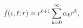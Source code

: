 \[\mathop{f\/}\nolimits\!\left(\epsilon,\ell;r\right)=r^{\ell+1}\sum_{k=0}^{%
\infty}\alpha_{k}r^{k},\]
